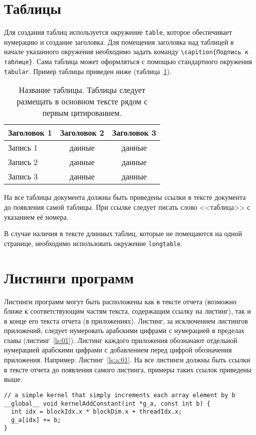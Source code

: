 \section{Таблицы}

Для создания таблиц используется окружение \verb|table|, которое обеспечивает
нумерацию и создание заголовка. Для помещения заголовка над
таблицей в начале указанного окружения необходимо задать команду
\verb|\capition{Подпись к таблице}|. Сама таблица может оформляться с помощью
стандартного окружения \verb|tabular|. Пример таблицы приведен ниже (таблица~\ref{tab:1}). 

\begin{table}[h]
\caption{Название таблицы. Таблицы следует размещать в основном тексте рядом с первым цитированием.}
\label{tab:1}
\begin{center}
\begin{tabular}{|l|c|c|}
\hline
Заголовок 1 & Заголовок 2 & Заголовок 3 \\
\hline
Запись 1 &данные &данные\\
\hline
Запись 2 &данные &данные\\
\hline
Запись 3 &данные &данные\\
\hline
\end{tabular}
\end{center}
\end{table}

На все таблицы документа должны быть приведены ссылки в тексте
документа до появления самой таблицы. При ссылке следует писать слово
<<таблица>> с указанием её номера.

В случае наличия в тексте длинных таблиц, которые не помещаются на одной
странице, необходимо использовать окружение \verb|longtable|.

\section{Листинги программ}

Листинги программ могут быть расположены как в тексте отчета (возможно ближе к 
соответствующим частям текста, содержащим ссылку на листинг),  так и в конце
его текста отчета (в приложениях). Листинг, за исключением листингов
приложений, следует нумеровать арабскими цифрами с нумерацией в пределах главы
(листинг~\ref{ls:01}).
Листинг каждого приложения обозначают отдельной нумерацией арабскими цифрами с
добавлением перед цифрой обозначения приложения.
Например: Листинг~\ref{ls:a:01}.
На все листинги должны быть ссылки в тексте отчета до появления самого
листинга, примеры таких ссылок приведены выше.

\begin{lstlisting}[caption={Пример листинга в тексте}, label={ls:01}]
// a simple kernel that simply increments each array element by b
__global__ void kernelAddConstant(int *g_a, const int b) {
  int idx = blockIdx.x * blockDim.x + threadIdx.x;
  g_a[idx] += b;
}
\end{lstlisting}
